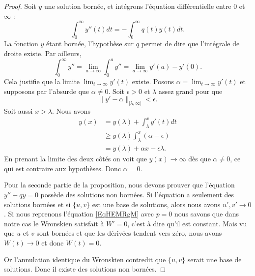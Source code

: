 \begin{proof}
    Soit \( y\) une solution bornée, et intégrons l'équation différentielle entre \( 0\) et \( \infty\) :
    \begin{equation}
        \int_0^{\infty}y''(t)dt=-\int_0^{\infty}q(t)y(t)dt.
    \end{equation}
    La fonction \( y\) étant bornée, l'hypothèse sur \( q\) permet de dire que l'intégrale de droite existe. Par ailleurs,
    \begin{equation}
        \int_0^{\infty}y''=\lim_{a\to \infty}\int_0^ay''=\lim_{a\to \infty}y'(a)-y'(0).
    \end{equation}
    Cela justifie que la limite \( \lim_{t\to \infty} y'(t)\) existe. Posons \( \alpha=\lim_{t\to \infty} y'(t)\) et supposons par l'absurde que \( \alpha\neq 0\). Soit \( \epsilon>0\) et \( \lambda\) assez grand pour que
    \begin{equation}
        \| y'-\alpha \|_{\mathopen[ \lambda , \infty [}<\epsilon.
    \end{equation}
    Soit aussi \( x>\lambda\). Nous avons
    \begin{subequations}
        \begin{align}
            y(x)&=y(\lambda)+\int_{\lambda}^xy'(t)dt\\
            &\geq y(\lambda)\int_{\lambda}^x(\alpha-\epsilon)\\
            &=y(\lambda)+\alpha x-\epsilon\lambda.
        \end{align}
    \end{subequations}
    En prenant la limite des deux côtés on voit que \( y(x)\to \infty\) dès que \( \alpha\neq 0\), ce qui est contraire aux hypothèses. Donc \( \alpha=0\).

    Pour la seconde partie de la proposition, nous devons prouver que l'équation \( y''+qy=0\) possède des solutions non bornées. Si l'équation a seulement des solutions bornées et si \( \{ u,v \}\) est une base de solutions, alors nous avons \( u',v'\to 0\). Si nous reprenons l'équation \eqref{EqHEMRgM} avec \( p=0\) nous savons que dans notre cas le Wronskien satisfait à \( W'=0\), c'est à dire qu'il est constant. Mais vu que \( u\) et \( v\) sont bornées et que les dérivées tendent vers zéro, nous avons \( W(t)\to 0\) et donc \( W(t)=0\).

    Or l'annulation identique du Wronskien contredit que \( \{ u,v \}\) serait une base de solutions. Donc il existe des solutions non bornées.
\end{proof}

